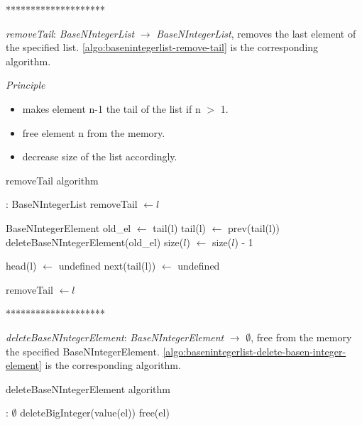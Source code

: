 \documentclass[book, nodocumentinfo]{upmethodology-document}
\newcommand{\separator}{\centerline{********************}}
\begin{document}
\separator

\emph{removeTail}: \emph{BaseNIntegerList} \(\rightarrow\) \emph{BaseNIntegerList},
removes the last element of the specified list.
\ref{algo:basenintegerlist-remove-tail} is the corresponding algorithm.

\emph{Principle}
\begin{itemize}
    \item makes element n-1 the tail of the list if n \(>\) 1.
    \item free element n from the memory.
    \item decrease size of the list accordingly.
\end{itemize}

\begin{algorithm}[H]
    \caption{removeTail algorithm}
    \label{algo:basenintegerlist-remove-tail}

    \begin{algorithmic}
         : BaseNIntegerList
                \State removeTail \(\leftarrow l\)
            \EndIf

            \State BaseNIntegerElement old\_el \(\leftarrow\) tail(l)
            \State tail(l) \(\leftarrow\) prev(tail(l))
            \State deleteBaseNIntegerElement(old\_el)
            \State size(\(l\)) \(\leftarrow\) size(\(l\)) - 1

                \State head(l) \(\leftarrow\) undefined
            \Else
                \State next(tail(l)) \(\leftarrow\) undefined
            \EndIf

            \State removeTail \(\leftarrow l\)
        \EndFunction
    \end{algorithmic}
\end{algorithm}

\separator

\emph{deleteBaseNIntegerElement}: \emph{BaseNIntegerElement} \(\rightarrow\) \(\emptyset\),
free from the memory the specified BaseNIntegerElement.
\ref{algo:basenintegerlist-delete-basen-integer-element} is the corresponding algorithm.

\begin{algorithm}[H]
    \caption{deleteBaseNIntegerElement algorithm}
    \label{algo:basenintegerlist-delete-basen-integer-element}

    \begin{algorithmic}
         : \(\emptyset\)
            \State deleteBigInteger(value(el))
            \State free(el)
        \EndFunction
    \end{algorithmic}
\end{algorithm}
\end{document}
